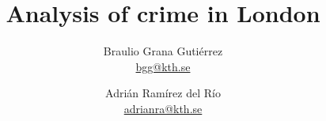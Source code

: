 \begin{titlepage}
\author{
        Braulio Grana Gutiérrez \\
        \href{mailto:bgg@kth.se}
        {bgg@kth.se}
        \and
        Adrián Ramírez del Río \\
        \href{adrianra@kth.se}
        {adrianra@kth.se} }

\title{{\Huge Analysis of crime in London}}
\maketitle
\end{titlepage}